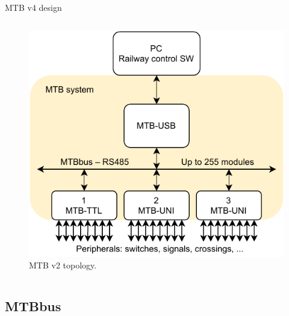 \documentclass[aspectratio=169]{beamer}
\begin{document}
\begin{frame}{MTB v4 design}
\begin{columns}
\begin{column}{.3\textwidth}
\begin{figure}
		\includegraphics[width=\columnwidth]{data/mtb-topology-en.pdf}
		\caption{MTB v2 topology.}
		\end{figure}
	\end{column}
\end{columns}
\end{frame}


\subsection{MTBbus}
\end{document}
